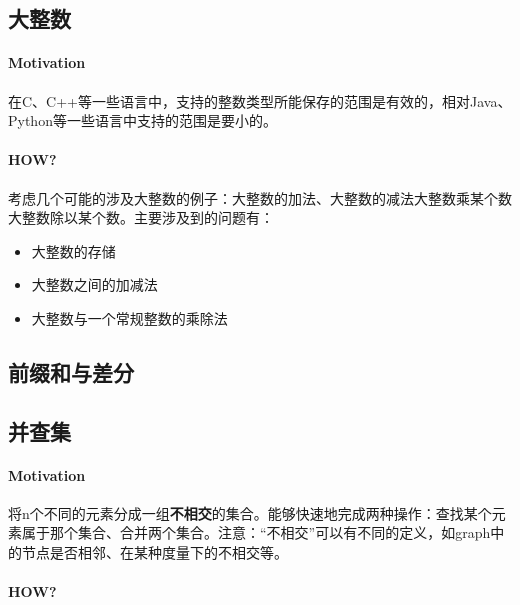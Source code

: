 \subsection{大整数}
\paragraph{Motivation}在C、C++等一些语言中，支持的整数类型所能保存的范围是有效的，相对Java、Python等一些语言中支持的范围是要小的。

\paragraph{HOW?}考虑几个可能的涉及大整数的例子：大整数的加法、大整数的减法大整数乘某个数大整数除以某个数。主要涉及到的问题有：
\begin{itemize}
	\item 大整数的存储
	\item 大整数之间的加减法
	\item 大整数与一个常规整数的乘除法
\end{itemize}


\subsection{前缀和与差分}


\subsection{并查集}
\paragraph{Motivation}将n个不同的元素分成一组\textbf{不相交}的集合。能够快速地完成两种操作：查找某个元素属于那个集合、合并两个集合。注意：“不相交”可以有不同的定义，如graph中的节点是否相邻、在某种度量下的不相交等。

\paragraph{HOW?}
